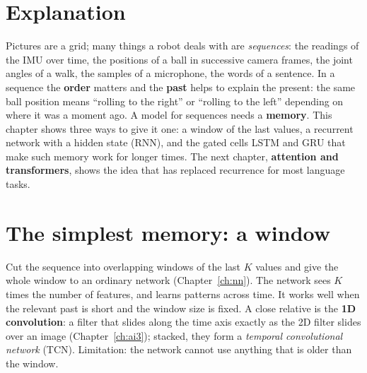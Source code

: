 \label{ch:ai6}

\section*{Explanation}
Pictures are a grid; many things a robot deals with are \emph{sequences}: the readings of the IMU over time, the positions of a ball in successive camera frames, the joint angles of a walk, the samples of a microphone, the words of a sentence. In a sequence the \textbf{order} matters and the \textbf{past} helps to explain the present: the same ball position means ``rolling to the right'' or ``rolling to the left'' depending on where it was a moment ago. A model for sequences needs a \textbf{memory}. This chapter shows three ways to give it one: a window of the last values, a recurrent network with a hidden state (RNN), and the gated cells LSTM and GRU that make such memory work for longer times. The next chapter, \textbf{attention and transformers}, shows the idea that has replaced recurrence for most language tasks.

\section*{The simplest memory: a window}
Cut the sequence into overlapping windows of the last $K$ values and give the whole window to an ordinary network (Chapter~\ref{ch:nn}). The network sees $K$ times the number of features, and learns patterns across time. It works well when the relevant past is short and the window size is fixed. A close relative is the \textbf{1D convolution}: a filter that slides along the time axis exactly as the 2D filter slides over an image (Chapter~\ref{ch:ai3}); stacked, they form a \emph{temporal convolutional network} (TCN). Limitation: the network cannot use anything that is older than the window.

